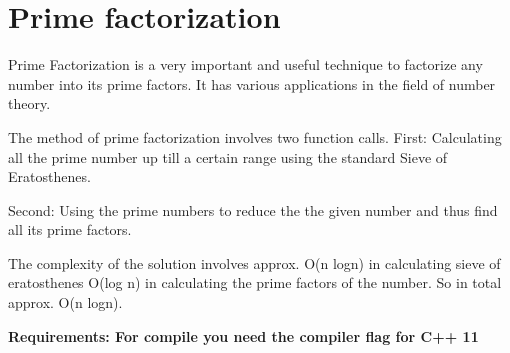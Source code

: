 \chapter{Prime factorization}
\hypertarget{section}{}\label{section}
\label{section_md_math_2_r_e_a_d_m_e}%
%


Prime Factorization is a very important and useful technique to factorize any number into its prime factors. It has various applications in the field of number theory.

The method of prime factorization involves two function calls. First\+: Calculating all the prime number up till a certain range using the standard Sieve of Eratosthenes.

Second\+: Using the prime numbers to reduce the the given number and thus find all its prime factors.

The complexity of the solution involves approx. O(n logn) in calculating sieve of eratosthenes O(log n) in calculating the prime factors of the number. So in total approx. O(n logn).

{\bfseries{Requirements\+: For compile you need the compiler flag for C++ 11}} 